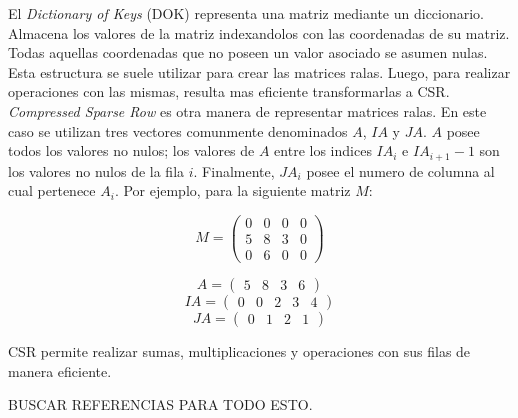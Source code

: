 
El \textit{Dictionary of Keys} (DOK) representa una matriz mediante un diccionario.
Almacena los valores de la matriz indexandolos con las coordenadas de su matriz.
Todas aquellas coordenadas que no poseen un valor asociado se asumen nulas. Esta 
estructura se suele utilizar para crear las matrices ralas. Luego, para realizar
operaciones con las mismas, resulta mas eficiente transformarlas a CSR. \\

\textit{Compressed Sparse Row} es otra manera de representar matrices
ralas. En este caso se utilizan tres vectores comunmente denominados $A$, $IA$ y
$JA$. $A$ posee todos los valores no nulos; los valores de $A$ entre los indices
$IA_i$ e $IA_{i+1}-1$ son los valores no nulos de la fila $i$. Finalmente, $JA_i$
posee el numero de columna al cual pertenece $A_i$. Por ejemplo, para la siguiente
matriz $M$:

$$
    M =
    \begin{pmatrix}
             0 & 0 & 0 & 0 \\
             5 & 8 & 3 & 0 \\
             0 & 6 & 0 & 0    
    \end{pmatrix}
$$    

$$ A  = \begin{pmatrix} 5 & 8 & 3 & 6     \end{pmatrix} $$
$$ IA = \begin{pmatrix} 0 & 0 & 2 & 3 & 4 \end{pmatrix} $$
$$ JA = \begin{pmatrix} 0 & 1 & 2 & 1     \end{pmatrix} $$

CSR permite realizar sumas, multiplicaciones y operaciones con sus filas de manera
eficiente. 

BUSCAR REFERENCIAS PARA TODO ESTO.
